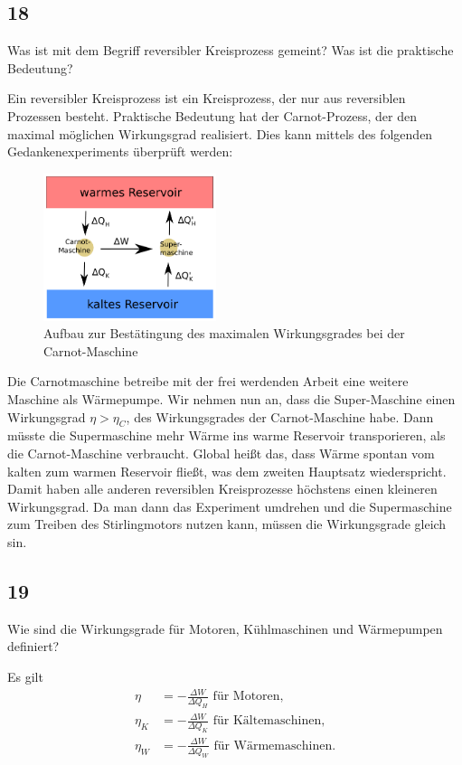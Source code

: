 \documentclass[12pt,a4paper]{report}
\newenvironment{myfrag}{\begin{it}}{\end{it}\vspace{3mm}\par}
\numberwithin{equation}{section}
\begin{document}
\subsection{18}
\begin{myfrag}
Was ist mit dem Begriff reversibler Kreisprozess gemeint? Was ist die praktische
Bedeutung?
\end{myfrag}
Ein reversibler Kreisprozess ist ein Kreisprozess, der nur aus reversiblen Prozessen besteht. Praktische Bedeutung hat der Carnot-Prozess, der den maximal möglichen Wirkungsgrad realisiert. Dies kann mittels des folgenden Gedankenexperiments überprüft werden:
\begin{figure}[H]
\centering
\includegraphics[width=0.45\textwidth]{Bilder/fr18.pdf}%
\caption{Aufbau zur Bestätingung des maximalen Wirkungsgrades bei der Carnot-Maschine}
\end{figure}
Die Carnotmaschine betreibe mit der frei werdenden Arbeit eine weitere Maschine als Wärmepumpe. Wir nehmen nun an, dass die Super-Maschine einen Wirkungsgrad $\eta>\eta_C$, des Wirkungsgrades der Carnot-Maschine habe. Dann müsste die Supermaschine mehr Wärme ins warme Reservoir transporieren, als die Carnot-Maschine verbraucht. Global heißt das, dass Wärme spontan vom kalten zum warmen Reservoir fließt, was dem zweiten Hauptsatz wiederspricht. Damit haben alle anderen reversiblen Kreisprozesse höchstens einen kleineren Wirkungsgrad. Da man dann das Experiment umdrehen und die Supermaschine zum Treiben des Stirlingmotors nutzen kann, müssen die Wirkungsgrade gleich sin.

\subsection{19}
\begin{myfrag}
Wie sind die Wirkungsgrade für Motoren, Kühlmaschinen und Wärmepumpen
definiert?
\end{myfrag}
Es gilt
\begin{align}
	\eta&=-\frac{\Delta W}{\Delta Q_H}\text{ für Motoren,}\\
	\eta_K&=-\frac{\Delta W}{\Delta Q_K}\text{ für Kältemaschinen,}\\
	\eta_W&=-\frac{\Delta W}{\Delta Q_W}\text{ für Wärmemaschinen.}
\end{align}
\end{document}
